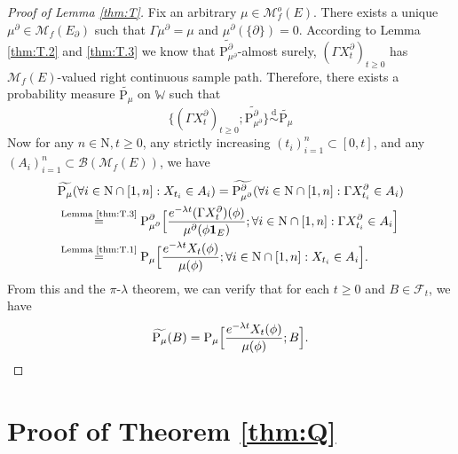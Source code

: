 \documentclass[12pt,a4paper]{amsart}
\numberwithin{equation}{section}
\theoremstyle{plain}
\theoremstyle{definition}
\theoremstyle{remark}
\begin{document}
\begin{proof}[Proof of Lemma \ref{thm:T}]
	Fix an arbitrary $\mu \in \mathcal M^o_f(E)$.
	There exists a unique $\mu^\partial \in \mathcal M_f(E_\partial)$ such that $\Gamma \mu^\partial = \mu$ and $\mu^{\partial}(\{\partial\}) = 0$.
	According to Lemma \ref{thm:T.2} and \ref{thm:T.3} we know that $\widetilde {\mathrm P_{\mu^\partial}^\partial}$-almost surely, $(\Gamma X^\partial_t)_{t\geq 0}$ has $\mathcal M_f(E)$-valued right continuous sample path.
	Therefore, there exists a probability measure $\widetilde{\mathrm P_\mu}$ on $\mathbb W$ such that
\[
	\{(\Gamma X^\partial_t)_{t\geq 0}; \widetilde {\mathrm P^\partial_{\mu^\partial}}\} \overset{\text{d}}\sim \widetilde {\mathrm P_\mu}
\]
	Now for any $n\in \mathrm N, t\geq 0$, any strictly increasing $(t_i)_{i=1}^n \subset [0,t]$, and any $(A_i)_{i=1}^n\subset \mathscr B(\mathcal M_f(E))$, we have
\begin{align}
	&\widetilde {\mathrm P_\mu}(\forall i\in \mathrm N\cap [1,n]: X_{t_i}\in A_i)
	= \widetilde {\mathrm P_{\mu^\partial}^\partial} (\forall i\in \mathrm N\cap [1,n]: \Gamma X^\partial_{t_i}\in A_i)
	\\ &\overset{\text{Lemma \ref{thm:T.3}}}= \mathrm P_{\mu^\partial}^\partial \Big[\frac{e^{-\lambda t}(\Gamma X^\partial_t)(\phi)}{\mu^\partial(\phi\mathbf 1_E)};\forall i\in \mathrm N\cap [1,n]: \Gamma X_{t_i}^{\partial}\in A_i\Big]
	\\ & \overset{\text{Lemma \ref{thm:T.1}}}= \mathrm P_\mu \Big[\frac{e^{-\lambda t}X_t(\phi)}{\mu(\phi)};\forall i\in \mathrm N\cap [1,n]: X_{t_i}\in A_i\Big].
\end{align}
	From this and the $\pi$-$\lambda$ theorem, we can verify that for each $t\geq 0$ and $B \in \mathscr F_t$, we have
\[
	\widetilde {\mathrm P_\mu}(B) = \mathrm P_\mu\Big[\frac{e^{-\lambda t}X_t(\phi)}{\mu(\phi)}; B\Big].
	\qedhere
\]
\end{proof}


\section{Proof of Theorem \ref{thm:Q}} \label{sec:Q}
	
\end{document}
